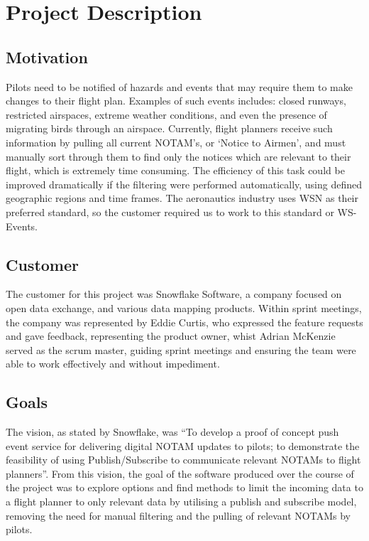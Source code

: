 \documentclass[a4paper, 12pt, twoside]{article}
\begin{document}
\newpage

\section{Project Description}
\subsection{Motivation}
\label{sec:intro_motivation}
Pilots need to be notified of hazards and events that may require them to make changes to their flight plan. Examples of such events includes: closed runways, restricted airspaces, extreme weather conditions, and even the presence of migrating birds through an airspace. Currently, flight planners receive such information by pulling all current NOTAM's, or `Notice to Airmen', and must manually sort through them to find only the notices which are relevant to their flight, which is extremely time consuming. The efficiency of this task could be improved dramatically if the filtering were performed automatically, using defined geographic regions and time frames. The aeronautics industry uses WSN as their preferred standard, so the customer required us to work to this standard or WS-Events.

\subsection{Customer}
\label{sec:intro_customer}

The customer for this project was Snowflake Software, a company focused on open data exchange, and various data mapping products. Within sprint meetings, the company was represented by Eddie Curtis, who expressed the feature requests and gave feedback, representing the product owner, whist Adrian McKenzie served as the scrum master, guiding sprint meetings and ensuring the team were able to work effectively and without impediment.

\subsection{Goals}
\label{sec:intro_goals}

The vision, as stated by Snowflake, was ``To develop a proof of concept push event service for delivering digital NOTAM updates to pilots; to demonstrate the feasibility of using Publish/Subscribe to communicate relevant NOTAMs to flight planners''. From this vision, the goal of the software produced over the course of the project was to explore options and find methods to limit the incoming data to a flight planner to only relevant data by utilising a publish and subscribe model, removing the need for manual filtering and the pulling of relevant NOTAMs by pilots.
\end{document}
